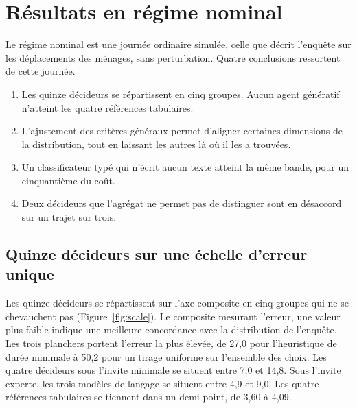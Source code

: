 
\section{Résultats en régime nominal}
\label{sec:results}

Le régime nominal est une journée ordinaire simulée, celle que décrit l'enquête sur les déplacements des ménages, sans perturbation. Quatre conclusions ressortent de cette journée.

\begin{enumerate}
  \item Les quinze décideurs se répartissent en cinq groupes. Aucun agent génératif n'atteint les quatre références tabulaires.
  \item L'ajustement des critères généraux permet d'aligner certaines dimensions de la distribution, tout en laissant les autres là où il les a trouvées.
  \item Un classificateur typé qui n'écrit aucun texte atteint la même bande, pour un cinquantième du coût.
  \item Deux décideurs que l'agrégat ne permet pas de distinguer sont en désaccord sur un trajet sur trois.
\end{enumerate}

\subsection{Quinze décideurs sur une échelle d'erreur unique}
\label{sec:scale}

Les quinze décideurs se répartissent sur l'axe composite en cinq groupes qui ne se chevauchent pas (Figure~\ref{fig:scale}). Le composite mesurant l'erreur, une valeur plus faible indique une meilleure concordance avec la distribution de l'enquête. Les trois planchers portent l'erreur la plus élevée, de 27,0 pour l'heuristique de durée minimale à 50,2 pour un tirage uniforme sur l'ensemble des choix. Les quatre décideurs sous l'invite minimale se situent entre 7,0 et 14,8. Sous l'invite experte, les trois modèles de langage se situent entre 4,9 et 9,0. Les quatre références tabulaires se tiennent dans un demi-point, de 3,60 à 4,09.

